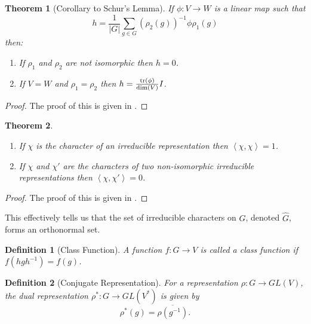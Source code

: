\documentclass{article}
\theoremstyle{plain}
\newtheorem{theorem}{Theorem}
\theoremstyle{centered}
\newtheorem{definition}{Definition}
\newcommand{\abs}[1]{\left\lvert #1 \right\rvert}
\newcommand{\inner}[2]{\left\langle #1, #2 \right\rangle}
\newcommand{\tr}[1]{\textnormal{tr}\left(#1\right)}
\renewcommand{\dim}[1]{\textnormal{dim}\left(#1\right)}
\newcommand{\conj}[1]{\overline{#1}}
\begin{document}
        \begin{theorem}[Corollary to Schur's Lemma]
            If $\phi: V \to W$ is a linear map such that 
                $$h = \frac{1}{\abs{G}} \sum_{g \in G} \left(\rho_2(g)\right)^{-1}\phi \rho_1(g)$$
            then:
                \begin{enumerate}
                \item If $\rho_1$ and $\rho_2$ are not isomorphic then $h = 0$.
                \item If $V = W$ and $\rho_1 = \rho_2$ then $h = \frac{\tr{\phi}}{\dim{V}} I$.
                \end{enumerate}
        \end{theorem}
        \begin{proof}
            The proof of this is given in \cite{serre}.
        \end{proof}

        \begin{theorem}\label{thm:serre15} %
            \begin{enumerate}
            \item If $\chi$ is the character of an irreducible representation then $\inner{\chi}{\chi} = 1$.
            \item If $\chi$ and $\chi'$ are the characters of two non-isomorphic irreducible representations then $\inner
{\chi}{\chi'} = 0$.
            \end{enumerate}
        \end{theorem}
        \begin{proof}
            The proof of this is given in \cite{serre}.
        \end{proof}
        This effectively tells us that the set of irreducible characters on $G$, denoted $\hat{G}$, forms an orthonormal set.

        \begin{definition}[Class Function]\label{def:class_function}
            A function $f : G \to V$ is called a \textit{class} function if $f(hgh^{-1}) = f(g)$.
        \end{definition}

        \begin{definition}[Conjugate Representation]\label{def:dual_representation}
            For a representation $\rho: G \to GL(V)$, the \textit{dual representation} $\rho^*: G \to GL(V^*)$ is given by
                $$\rho^*(g) = \conj{\rho(g^{-1})}.$$
        \end{definition}
\end{document}
